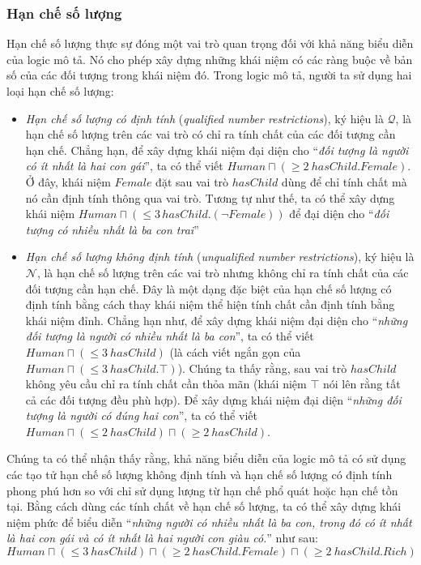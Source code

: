 \documentclass[12pt,a4paper,twoside]{report}
\newcommand{\mand}		{\sqcap}
\newcommand{\Human}			{Human}
\newcommand{\Female}		{Female}
\newcommand{\Rich}			{Rich}
\newcommand{\hasChild}		{hasChild}
\theoremstyle{definition}
\begin{document}
\subsubsection{Hạn chế số lượng}
\label{subsec:NumberRestrictions}
Hạn chế số lượng thực sự đóng một vai trò quan trọng đối với khả năng biểu diễn của logic mô tả. Nó cho phép xây dựng những khái niệm có các ràng buộc về bản số của các đối tượng trong khái niệm đó.
Trong logic mô tả, người ta sử dụng hai loại hạn chế số lượng:
\begin{itemize}
  \item {\em Hạn chế số lượng có định tính} ({\em qualified number restrictions}), ký hiệu là $\mathcal{Q}$, là hạn chế số lượng trên các vai trò có chỉ ra tính chất của các đối tượng cần hạn chế.
  Chẳng hạn, để xây dựng khái niệm đại diện cho ``\textit{đối tượng là người có ít nhất là hai con gái}'', ta có thể viết $\Human \mand (\geq 2\ \hasChild.\Female)$. Ở đây, khái niệm $\Female$ đặt sau vai trò $\hasChild$ dùng để chỉ tính chất mà nó cần định tính thông qua vai trò. Tương tự như thế, ta có thể xây dựng khái niệm $\Human \mand (\leq 3\,\hasChild.(\neg \Female))$ để đại diện cho ``\textit{đối tượng có nhiều nhất là ba con trai}''
    
  \item {\em Hạn chế số lượng không định tính} ({\em unqualified number restrictions}), ký hiệu là $\mathcal{N}$, là hạn chế số lượng trên các vai trò nhưng không chỉ ra tính chất của các đối tượng cần hạn chế. Đây là một dạng đặc biệt của hạn chế số lượng có định tính bằng cách thay khái niệm thể hiện tính chất cần định tính bằng khái niệm đỉnh.
  Chẳng hạn như, để xây dựng khái niệm đại diện cho ``\textit{những đối tượng là người có nhiều nhất là ba con}'', ta có thể viết $\Human \mand (\leq 3\ \hasChild)$ (là cách viết ngắn gọn của $\Human \mand (\leq 3\ \hasChild.\top)$). Chúng ta thấy rằng, sau vai trò $\hasChild$ không yêu cầu chỉ ra tính chất cần thỏa mãn (khái niệm $\top$ nói lên rằng tất cả các đối tượng đều phù hợp). Để xây dựng khái niệm đại diện ``\textit{những đối tượng là người có đúng hai con}'', ta có thể viết $\Human \mand (\leq 2\ \hasChild) \mand (\geq 2\ \hasChild)$.
\end{itemize}

Chúng ta có thể nhận thấy rằng, khả năng biểu diễn của logic mô tả có sử dụng các tạo tử hạn chế số lượng không định tính và hạn chế số lượng có định tính phong phú hơn so với chỉ sử dụng lượng từ hạn chế phổ quát hoặc hạn chế tồn tại. Bằng cách dùng các tính chất về hạn chế số lượng, ta có thể xây dựng khái niệm phức để biểu diễn ``{\em những người có nhiều nhất là ba con, trong đó có ít nhất là hai con gái và có ít nhất là hai người con giàu có.}'' như sau:
$$\Human \mand (\leq 3\ \hasChild) \mand (\geq 2\ \hasChild.\Female) \mand (\geq 2\ \hasChild.\Rich)$$
\end{document}
